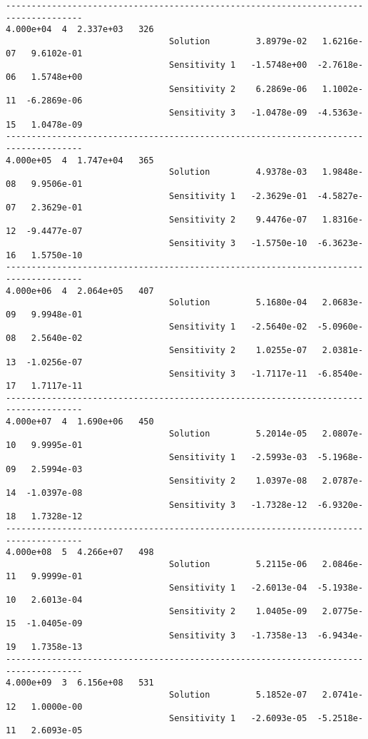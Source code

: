 \begin{verbatim}
-------------------------------------------------------------------------------------
4.000e+04  4  2.337e+03   326
                                Solution         3.8979e-02   1.6216e-07   9.6102e-01 
                                Sensitivity 1   -1.5748e+00  -2.7618e-06   1.5748e+00 
                                Sensitivity 2    6.2869e-06   1.1002e-11  -6.2869e-06 
                                Sensitivity 3   -1.0478e-09  -4.5363e-15   1.0478e-09 
-------------------------------------------------------------------------------------
4.000e+05  4  1.747e+04   365
                                Solution         4.9378e-03   1.9848e-08   9.9506e-01 
                                Sensitivity 1   -2.3629e-01  -4.5827e-07   2.3629e-01 
                                Sensitivity 2    9.4476e-07   1.8316e-12  -9.4477e-07 
                                Sensitivity 3   -1.5750e-10  -6.3623e-16   1.5750e-10 
-------------------------------------------------------------------------------------
4.000e+06  4  2.064e+05   407
                                Solution         5.1680e-04   2.0683e-09   9.9948e-01 
                                Sensitivity 1   -2.5640e-02  -5.0960e-08   2.5640e-02 
                                Sensitivity 2    1.0255e-07   2.0381e-13  -1.0256e-07 
                                Sensitivity 3   -1.7117e-11  -6.8540e-17   1.7117e-11 
-------------------------------------------------------------------------------------
4.000e+07  4  1.690e+06   450
                                Solution         5.2014e-05   2.0807e-10   9.9995e-01 
                                Sensitivity 1   -2.5993e-03  -5.1968e-09   2.5994e-03 
                                Sensitivity 2    1.0397e-08   2.0787e-14  -1.0397e-08 
                                Sensitivity 3   -1.7328e-12  -6.9320e-18   1.7328e-12 
-------------------------------------------------------------------------------------
4.000e+08  5  4.266e+07   498
                                Solution         5.2115e-06   2.0846e-11   9.9999e-01 
                                Sensitivity 1   -2.6013e-04  -5.1938e-10   2.6013e-04 
                                Sensitivity 2    1.0405e-09   2.0775e-15  -1.0405e-09 
                                Sensitivity 3   -1.7358e-13  -6.9434e-19   1.7358e-13 
-------------------------------------------------------------------------------------
4.000e+09  3  6.156e+08   531
                                Solution         5.1852e-07   2.0741e-12   1.0000e-00 
                                Sensitivity 1   -2.6093e-05  -5.2518e-11   2.6093e-05 

\end{verbatim}
